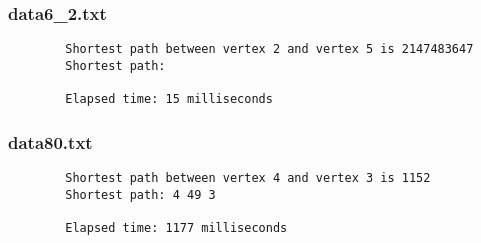 \documentclass{article}
\begin{document}
    \subsubsection*{data6\_2.txt}
    \begin{verbatim}
        Shortest path between vertex 2 and vertex 5 is 2147483647
        Shortest path:

        Elapsed time: 15 milliseconds
    \end{verbatim}

    \subsubsection*{data80.txt}
    \begin{verbatim}
        Shortest path between vertex 4 and vertex 3 is 1152
        Shortest path: 4 49 3

        Elapsed time: 1177 milliseconds
    \end{verbatim}
\end{document}
